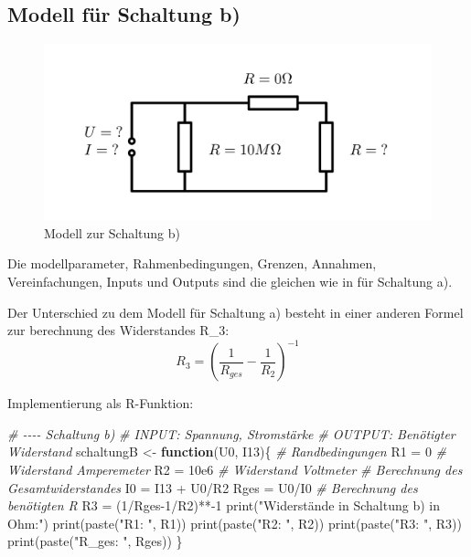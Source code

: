 \documentclass[
  9pt,
]{article}
\newenvironment{Shaded}{\begin{snugshade}}{\end{snugshade}}
\newcommand{\CommentTok}[1]{\textcolor[rgb]{0.56,0.35,0.01}{\textit{#1}}}
\newcommand{\ControlFlowTok}[1]{\textcolor[rgb]{0.13,0.29,0.53}{\textbf{#1}}}
\newcommand{\DecValTok}[1]{\textcolor[rgb]{0.00,0.00,0.81}{#1}}
\newcommand{\FloatTok}[1]{\textcolor[rgb]{0.00,0.00,0.81}{#1}}
\newcommand{\FunctionTok}[1]{\textcolor[rgb]{0.00,0.00,0.00}{#1}}
\newcommand{\NormalTok}[1]{#1}
\newcommand{\OtherTok}[1]{\textcolor[rgb]{0.56,0.35,0.01}{#1}}
\newcommand{\SpecialCharTok}[1]{\textcolor[rgb]{0.00,0.00,0.00}{#1}}
\newcommand{\StringTok}[1]{\textcolor[rgb]{0.31,0.60,0.02}{#1}}
\begin{document}
\hypertarget{modell-fuxfcr-schaltung-b}{%
\subsection{Modell für Schaltung b)}\label{modell-fuxfcr-schaltung-b}}

\begin{figure}
\centering
\includegraphics[width=\textwidth,height=0.2\textheight]{Bilder/ModellB.png}
\caption{Modell zur Schaltung b)}
\end{figure}

Die modellparameter, Rahmenbedingungen, Grenzen, Annahmen,
Vereinfachungen, Inputs und Outputs sind die gleichen wie in für
Schaltung a).

Der Unterschied zu dem Modell für Schaltung a) besteht in einer anderen
Formel zur berechnung des Widerstandes R\_3:
\[R_3=(\frac{1}{R_{ges}}-\frac{1}{R_2})^{-1}\]

Implementierung als R-Funktion:

\begin{Shaded}
\begin{Highlighting}[]
\CommentTok{\# {-}{-}{-}{-} Schaltung b)}
\CommentTok{\# INPUT: Spannung, Stromstärke}
\CommentTok{\# OUTPUT: Benötigter Widerstand}
\NormalTok{schaltungB }\OtherTok{\textless{}{-}} \ControlFlowTok{function}\NormalTok{(U0, I13)\{}
  \CommentTok{\# Randbedingungen}
\NormalTok{  R1 }\OtherTok{=} \DecValTok{0} \CommentTok{\# Widerstand Amperemeter}
\NormalTok{  R2 }\OtherTok{=} \FloatTok{10e6} \CommentTok{\# Widerstand Voltmeter}
  \CommentTok{\# Berechnung des Gesamtwiderstandes}
\NormalTok{  I0 }\OtherTok{=}\NormalTok{ I13 }\SpecialCharTok{+}\NormalTok{ U0}\SpecialCharTok{/}\NormalTok{R2}
\NormalTok{  Rges }\OtherTok{=}\NormalTok{ U0}\SpecialCharTok{/}\NormalTok{I0}
  \CommentTok{\# Berechnung des benötigten R}
\NormalTok{  R3 }\OtherTok{=}\NormalTok{ (}\DecValTok{1}\SpecialCharTok{/}\NormalTok{Rges}\DecValTok{{-}1}\SpecialCharTok{/}\NormalTok{R2)}\SpecialCharTok{**{-}}\DecValTok{1}
  \FunctionTok{print}\NormalTok{(}\StringTok{"Widerstände in Schaltung b) in Ohm:"}\NormalTok{)}
  \FunctionTok{print}\NormalTok{(}\FunctionTok{paste}\NormalTok{(}\StringTok{"R1: "}\NormalTok{, R1))}
  \FunctionTok{print}\NormalTok{(}\FunctionTok{paste}\NormalTok{(}\StringTok{"R2: "}\NormalTok{, R2))}
  \FunctionTok{print}\NormalTok{(}\FunctionTok{paste}\NormalTok{(}\StringTok{"R3: "}\NormalTok{, R3))}
  \FunctionTok{print}\NormalTok{(}\FunctionTok{paste}\NormalTok{(}\StringTok{"R\_ges: "}\NormalTok{, Rges))}
\NormalTok{\}}
\end{Highlighting}
\end{Shaded}
\end{document}
